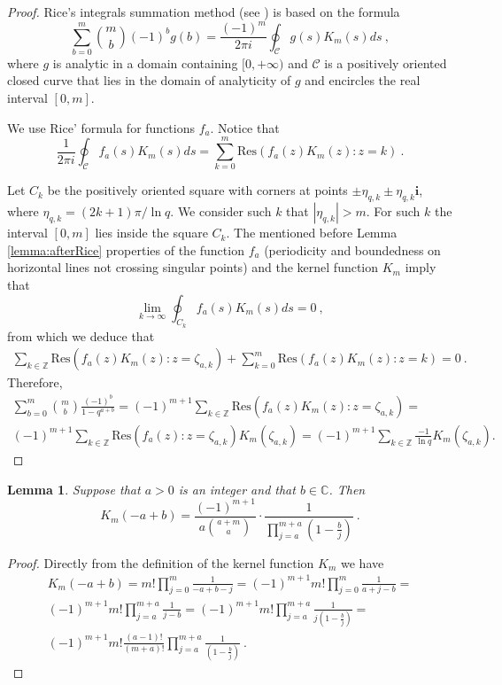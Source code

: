 \documentclass[proceedings]{dmtcs}
\newtheorem{lemma}{Lemma}
\newcommand{\ZZ}{\mathbb{Z}}
\newcommand{\CC}{\mathbb{C}}
\newcommand{\Res}[3]{\mathrm{Res}(#1:#2=#3)}
\begin{document}
\begin{proof}
Rice's integrals summation method (see \cite{Knuth:1998:ACP:280635}) is based on the formula
$$
  \sum_{b=0}^{m} \binom{m}{b}(-1)^b g(b) = 
	\frac{(-1)^m}{2 \pi i} \oint_{\mathcal{C}} g(s) K_m(s) ds ~,
$$  
where $g$ is analytic in a domain containing $[0,+\infty)$ and
$\mathcal{C}$ is a positively oriented closed curve that lies in the domain of analyticity of $g$ and
encircles the real interval $[0, m]$. 

We use Rice' formula for functions $f_a$. 
Notice that
$$
\frac{1}{2 \pi i} \oint_{\mathcal{C}} f_a(s) K_m(s) ds =  \sum_{k=0}^{m} \Res{f_a(z)K_m(z)}{z}{k}~.
$$

Let $C_k$ be the positively oriented square with corners at points
$\pm \eta_{q,k} \pm \eta_{q,k} \mathbf{i}$, where $\eta_{q,k} = (2k+1)\pi/\ln q$. We consider such $k$ that
$|\eta_{q,k}|>m$. For such $k$ the interval $[0,m]$ lies inside the square $C_k$. 
The mentioned before Lemma \ref{lemma:afterRice} properties of the function $f_a$ 
(periodicity and boundedness on horizontal lines not crossing singular points) and the kernel function $K_m$ imply that
$$
  \lim_{k\to\infty} \oint_{C_k} f_a(s) K_m(s) ds = 0~, 
$$ 
from which we deduce that
\begin{gather*}
  \sum_{k\in\ZZ} \Res{f_a(z) K_m(z)}{z}{\zeta_{a,k}} + 
	\sum_{k=0}^{m} \Res{f_a(z)K_m(z)}{z}{k} = 0~.
\end{gather*}
Therefore,
\begin{gather*}
\sum_{b=0}^{m} \binom{m}{b} \frac{(-1)^b}{1- q^{a+b}} = 
  (-1)^{m+1} \sum_{k\in\ZZ} \Res{f_a(z) K_m(z)}{z}{\zeta_{a,k}} = \\ 
	(-1)^{m+1} \sum_{k\in\ZZ} \Res{f_a(z)}{z}{\zeta_{a,k}} K_m(\zeta_{a,k}) = 
	(-1)^{m+1} \sum_{k\in\ZZ} \frac{-1}{\ln q} K_m(\zeta_{a,k}).
\end{gather*}
\end{proof}

\begin{lemma}
\label{lemma:kernelfunction}
Suppose that $a>0$ is an integer and that $b\in\CC$. Then
$$
  K_m(-a + b) =  
	\frac{(-1)^{m+1}}{a \binom{a+m}{a}} \cdot \frac{1}{\prod_{j=a}^{m+a} (1 - \frac{b}{j})} ~.
$$
\end{lemma}
\begin{proof}
Directly from the definition of the kernel function $K_m$ we have
\begin{gather*}
K_m(-a + b) = m! \prod_{j=0}^{m} \frac{1}{-a+b-j} = 
(-1)^{m+1} m! \prod_{j=0}^{m} \frac{1}{a+j-b} = \\
(-1)^{m+1} m! \prod_{j=a}^{m+a} \frac{1}{j-b} = 
(-1)^{m+1} m! \prod_{j=a}^{m+a} \frac{1}{j(1-\frac{b}{j})}=\\
(-1)^{m+1} m! \frac{(a-1)!}{(m+a)!} \prod_{j=a}^{m+a} \frac{1}{(1-\frac{b}{j})} ~.
\end{gather*}
\end{proof}
\end{document}
